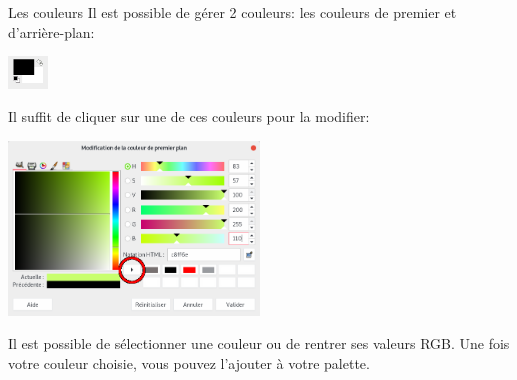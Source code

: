 \documentclass[10pt,svgnames,usenames,table]{beamer}
\begin{document}
\begin{frame}{Les couleurs}
	Il est possible de gérer 2 couleurs: les couleurs de premier et d'arrière-plan:
	\begin{center}
		\includegraphics[width=0.08\textwidth]{Images/color_primary.png}
	\end{center}
	Il suffit de cliquer sur une de ces couleurs pour la modifier:
	\begin{center}
		\includegraphics[width=0.5\textwidth]{Images/color_selector.png}
	\end{center}
	Il est possible de sélectionner une couleur ou de rentrer ses valeurs RGB. Une fois votre couleur choisie, vous pouvez l'ajouter à votre palette.
\end{frame}
\end{document}
